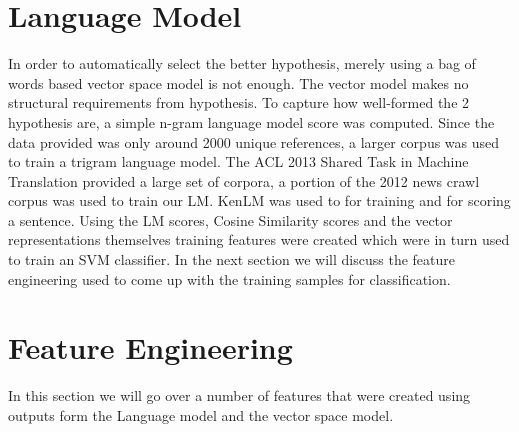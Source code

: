 \documentclass[11pt]{article}
\begin{document}
 \section{Language Model}
 In order to automatically select the better hypothesis, merely using a bag of
 words based vector space model is not enough. The vector model makes no
 structural requirements from hypothesis. To capture how well-formed the 2
 hypothesis are, a simple n-gram language model score was computed. Since the
 data provided was only around 2000 unique references, a larger corpus was used
 to train a trigram language model. The ACL 2013 Shared Task in Machine
 Translation provided a large set of corpora, a portion of the 2012 news crawl
 corpus was used to train our LM. KenLM was used to for training and for scoring a
 sentence\cite{heafield2011kenlm}. Using the LM scores, Cosine Similarity
 scores and the vector representations themselves training features were created
 which were in turn used to train an SVM classifier. In the next section we will
 discuss the feature engineering used to come up with the training samples for
 classification.
 \section{Feature Engineering}
In this section we will go over a number of features that were created using
outputs form the Language model and the vector space model.
\end{document}
